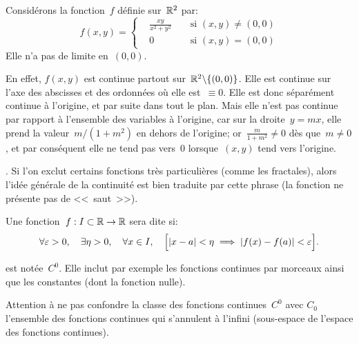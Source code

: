\medskip
Considérons la fonction~$f$ définie sur~$\mathbb R^2$ par:
\begin{equation}
  f(x,y)=\left\{\begin{aligned}&\frac{xy}{x^2+y^2}&&\text{ si } (x,y)\neq(0,0) \\
&0&&\text{ si } (x,y)=(0,0) \end{aligned}\right.
\end{equation}
Elle n'a pas de limite en~$(0,0)$.

\small
En effet, $f(x,y)$ est continue partout sur~$\mathbb R^2\backslash\{(0,0)\}$.
Elle est continue sur l'axe des abscisses et des ordonnées où elle est~$\equiv0$.
Elle est donc séparément continue à l'origine, et par suite dans tout le plan.
Mais elle n'est pas continue par rapport à l'ensemble des variables à l'origine,
car sur la droite~$y=mx$, elle prend la valeur~$m/(1+m^2)$ en dehors de
l'origine; or~$\frac{m}{1+m^2}\ne0$ dès que~$m\ne0$, et par conséquent elle
ne tend pas vers~$0$ lorsque~$(x,y)$ tend vers l'origine.
\normalsize

\medskip
{}.
Si l'on exclut certains fonctions très particulières (comme les fractales), alors l'idée générale
de la continuité est bien traduite par cette phrase (la fonction ne présente pas de <<~saut~>>).

\medskip
\begin{definition}
Une fonction~$f: I\subset\mathbb R \to \mathbb R$ sera dite  si:
\begin{equation}
  \forall \varepsilon > 0, \quad \exists \eta > 0, \quad \forall x \in I, \quad \Bigl[|x - a| <\eta \implies |f(x) - f(a)|<\varepsilon\Bigr].
\end{equation}
\end{definition}

\medskip
{} est notée~$C^0$.
Elle inclut par exemple les fonctions continues par morceaux ainsi que les constantes (dont
la fonction nulle).

\medskip
Attention à ne pas confondre la classe des fonctions continues~$C^0$ avec
$C_0$ l'ensemble des fonctions continues qui s'annulent à l'infini (sous-espace de l'espace
des fonctions continues).

